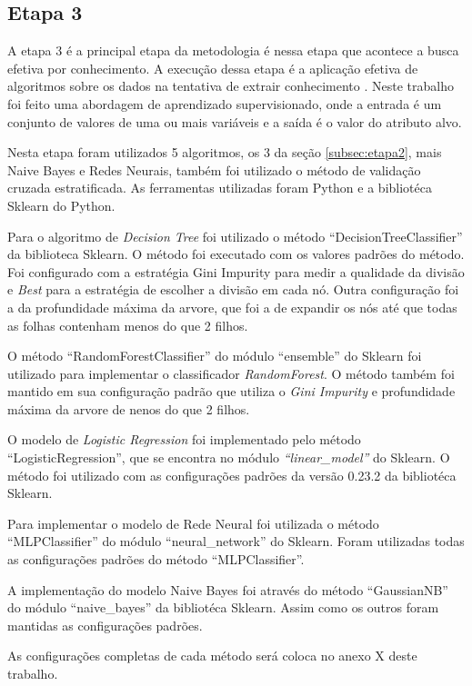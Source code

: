\documentclass[diss,capa]{texufpel}
\begin{document}
\subsection{Etapa 3}

A etapa 3 é a principal etapa da metodologia é nessa etapa que acontece a busca efetiva por conhecimento.
A execução dessa etapa é a aplicação efetiva de algoritmos sobre os dados na tentativa de extrair conhecimento \cite{goldschmidt2015data}.
Neste trabalho foi feito uma abordagem de aprendizado supervisionado, onde a entrada é um conjunto de valores de uma ou mais variáveis e a saída é o valor do atributo alvo.

Nesta etapa foram utilizados 5 algoritmos, os 3 da seção \ref{subsec:etapa2}, mais Naive Bayes e Redes Neurais, também foi utilizado o método de validação cruzada estratificada.
As ferramentas utilizadas foram Python e a bibliotéca Sklearn do Python.

Para o algoritmo de \textit{Decision Tree} foi utilizado o método ``DecisionTreeClassifier'' da biblioteca Sklearn.
O método foi executado com os valores padrões do método.
Foi configurado com a estratégia Gini Impurity para medir a qualidade da divisão e \textit{Best} para a estratégia de escolher a divisão em cada nó.
Outra configuração foi a da profundidade máxima da arvore, que foi a de expandir os nós até que todas as folhas contenham menos do que 2 filhos.

O método ``RandomForestClassifier'' do módulo ``ensemble'' do Sklearn foi utilizado para implementar o classificador \textit{RandomForest}.
O método também foi mantido em sua configuração padrão que utiliza o \textit{Gini Impurity} e profundidade máxima da arvore de nenos do que 2 filhos.

O modelo de \textit{Logistic Regression} foi implementado pelo método ``LogisticRegression'', que se encontra no módulo \textit{``linear\_model''} do Sklearn.
O método foi utilizado com as configurações padrões da versão 0.23.2 da bibliotéca Sklearn.

Para implementar o modelo de Rede Neural foi utilizada o método ``MLPClassifier'' do módulo ``neural\_network'' do Sklearn. Foram utilizadas todas as configurações padrões do método ``MLPClassifier''.

A implementação do modelo Naive Bayes foi através do método ``GaussianNB'' do módulo ``naive\_bayes'' da bibliotéca Sklearn.
Assim como os outros foram mantidas as configurações padrões.

As configurações completas de cada método será coloca no anexo X deste trabalho.
\end{document}
